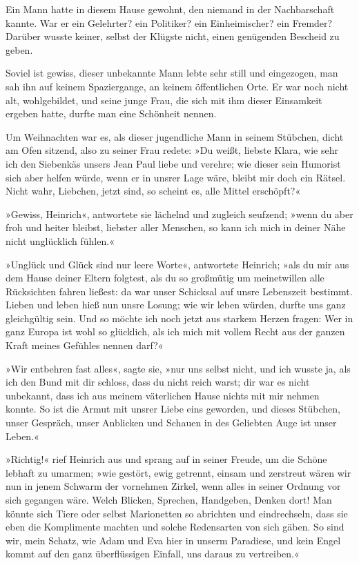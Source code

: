 Ein Mann hatte in diesem Hause gewohnt, den niemand in der Nachbarschaft kannte. War er ein Gelehrter? ein Politiker? ein Einheimischer? ein Fremder? Darüber wusste keiner, selbst der Klügste nicht, einen genügenden Bescheid zu geben.

Soviel ist gewiss, dieser unbekannte Mann lebte sehr still und eingezogen, man sah ihn auf keinem Spaziergange, an keinem öffentlichen Orte. Er war noch nicht alt, wohlgebildet, und seine junge Frau, die sich mit ihm dieser Einsamkeit ergeben hatte, durfte man eine Schönheit nennen.

Um Weihnachten war es, als dieser jugendliche Mann in seinem Stübchen, dicht am Ofen sitzend, also zu seiner Frau redete: »Du weißt, liebste Klara, wie sehr ich den Siebenkäs unsers Jean Paul liebe und verehre; wie dieser sein Humorist sich aber helfen würde, wenn er in unsrer Lage wäre, bleibt mir doch ein Rätsel. Nicht wahr, Liebchen, jetzt sind, so scheint es, alle Mittel erschöpft?«

»Gewiss, Heinrich«, antwortete sie lächelnd und zugleich seufzend; »wenn du aber froh und heiter bleibst, liebster aller Menschen, so kann ich mich in deiner Nähe nicht unglücklich fühlen.«

»Unglück und Glück sind nur leere Worte«, antwortete Heinrich; »als du mir aus dem Hause deiner Eltern folgtest, als du so großmütig um meinetwillen alle Rücksichten fahren ließest: da war unser Schicksal auf unsre Lebenszeit bestimmt. Lieben und leben hieß nun unsre Losung; wie wir leben würden, durfte uns ganz gleichgültig sein. Und so möchte ich noch jetzt aus starkem Herzen fragen: Wer in ganz Europa ist wohl so glücklich, als ich mich mit vollem Recht aus der ganzen Kraft meines Gefühles nennen darf?«

»Wir entbehren fast alles«, sagte sie, »nur uns selbst nicht, und ich wusste ja, als ich den Bund mit dir schloss, dass du nicht reich warst; dir war es nicht unbekannt, dass ich aus meinem väterlichen Hause nichts mit mir nehmen konnte. So ist die Armut mit unsrer Liebe eins geworden, und dieses Stübchen, unser Gespräch, unser Anblicken und Schauen in des Geliebten Auge ist unser Leben.«

»Richtig!« rief Heinrich aus und sprang auf in seiner Freude, um die Schöne lebhaft zu umarmen; »wie gestört, ewig getrennt, einsam und zerstreut wären wir nun in jenem Schwarm der vornehmen Zirkel, wenn alles in seiner Ordnung vor sich gegangen wäre. Welch Blicken, Sprechen, Handgeben, Denken dort! Man könnte sich Tiere oder selbst Marionetten so abrichten und eindrechseln, dass sie eben die Komplimente machten und solche Redensarten von sich gäben. So sind wir, mein Schatz, wie Adam und Eva hier in unserm Paradiese, und kein Engel kommt auf den ganz überflüssigen Einfall, uns daraus zu vertreiben.«

